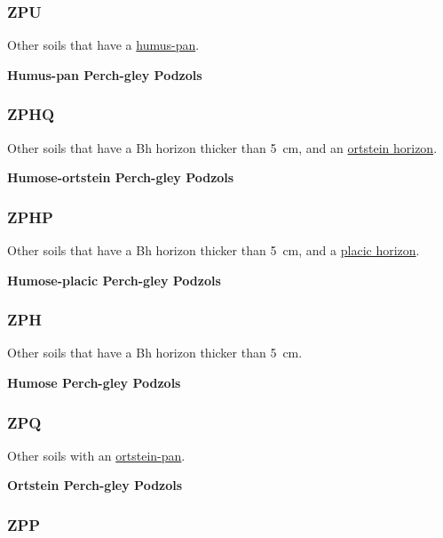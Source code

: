 \documentclass[
  letterpaper,
  DIV=11,
  numbers=noendperiod]{scrreprt}
\begin{document}
\hypertarget{sec-key-ZPU}{%
\subsubsection{\texorpdfstring{\textbf{ZPU}}{ZPU}}\label{sec-key-ZPU}}

Other soils that have a \protect\hyperlink{sec-diag-hpan}{humus-pan}.

\textbf{Humus-pan Perch-gley Podzols}

\hypertarget{sec-key-ZPHQ}{%
\subsubsection{\texorpdfstring{\textbf{ZPHQ}}{ZPHQ}}\label{sec-key-ZPHQ}}

Other soils that have a Bh horizon thicker than 5~cm, and an
\protect\hyperlink{sec-diag-opan}{ortstein horizon}.

\textbf{Humose-ortstein Perch-gley Podzols}

\hypertarget{sec-key-ZPHP}{%
\subsubsection{\texorpdfstring{\textbf{ZPHP}}{ZPHP}}\label{sec-key-ZPHP}}

Other soils that have a Bh horizon thicker than 5~cm, and a
\protect\hyperlink{sec-diag_plac}{placic horizon}.

\textbf{Humose-placic Perch-gley Podzols}

\hypertarget{sec-key-ZPH}{%
\subsubsection{\texorpdfstring{\textbf{ZPH}}{ZPH}}\label{sec-key-ZPH}}

Other soils that have a Bh horizon thicker than 5~cm.

\textbf{Humose Perch-gley Podzols}

\hypertarget{sec-key-ZPQ}{%
\subsubsection{\texorpdfstring{\textbf{ZPQ}}{ZPQ}}\label{sec-key-ZPQ}}

Other soils with an \protect\hyperlink{sec-diag-opan}{ortstein-pan}.

\textbf{Ortstein Perch-gley Podzols}

\hypertarget{sec-key-ZPP}{%
\subsubsection{\texorpdfstring{\textbf{ZPP}}{ZPP}}\label{sec-key-ZPP}}
\end{document}
